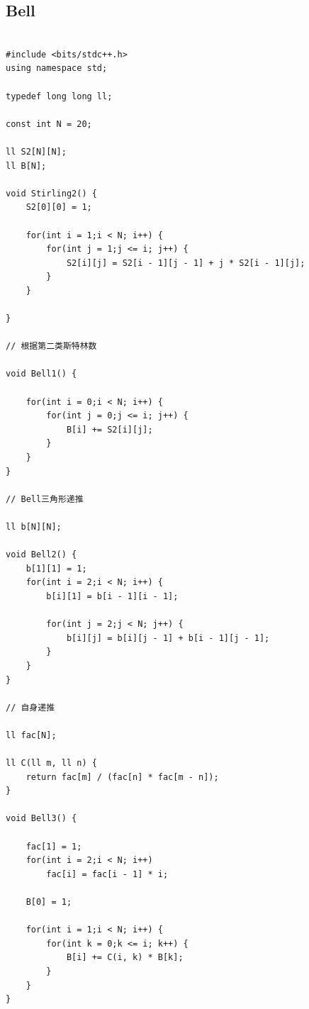 \documentclass[twoside]{article}
\begin{document}
\subsection{Bell}
\begin{lstlisting}

#include <bits/stdc++.h>
using namespace std;

typedef long long ll;

const int N = 20;

ll S2[N][N];
ll B[N];

void Stirling2() {
    S2[0][0] = 1;
    
    for(int i = 1;i < N; i++) {
        for(int j = 1;j <= i; j++) {
            S2[i][j] = S2[i - 1][j - 1] + j * S2[i - 1][j];
        }
    } 

}

// 根据第二类斯特林数

void Bell1() {
    
    for(int i = 0;i < N; i++) {
        for(int j = 0;j <= i; j++) {
            B[i] += S2[i][j];
        }
    }
}

// Bell三角形递推

ll b[N][N];

void Bell2() {
    b[1][1] = 1;
    for(int i = 2;i < N; i++) {
        b[i][1] = b[i - 1][i - 1];
        
        for(int j = 2;j < N; j++) {
            b[i][j] = b[i][j - 1] + b[i - 1][j - 1];
        }
    }
}

// 自身递推

ll fac[N];

ll C(ll m, ll n) {
    return fac[m] / (fac[n] * fac[m - n]);
}

void Bell3() {

    fac[1] = 1;
    for(int i = 2;i < N; i++)
        fac[i] = fac[i - 1] * i;

    B[0] = 1;

    for(int i = 1;i < N; i++) {
        for(int k = 0;k <= i; k++) {
            B[i] += C(i, k) * B[k];
        }
    }
}

\end{lstlisting}
\end{document}
